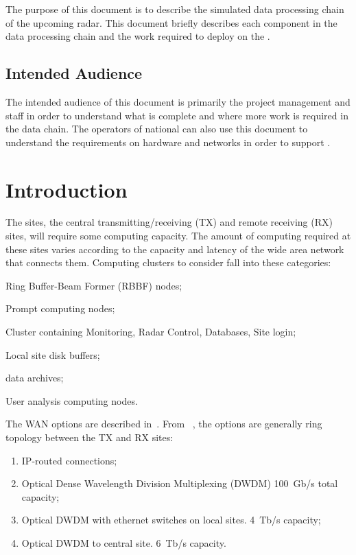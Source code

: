 \documentclass[12pt,a4paper]{article}
\begin{document}
The purpose of this document is to describe the simulated data processing chain of the upcoming \ED radar.
This document briefly describes each component in the data processing chain and the work required to deploy on the .

\subsection{Intended Audience}

The intended audience of this document is primarily the \ED project management and staff in order to understand what is complete and where more work is required in the data chain.
The operators of national  can also use this document to understand the requirements on hardware and networks in order to support \ED.

\section{Introduction}
\label{intro}

The \ED sites, the central transmitting/receiving (TX) and remote receiving (RX) sites, will require some computing capacity.
The amount of computing required at these sites varies according to the capacity and latency of the wide area network that connects them.
Computing clusters to consider fall into these categories:
\bitm
\item Ring Buffer-Beam Former (RBBF) nodes;
\item Prompt computing nodes;
\item Cluster containing Monitoring, Radar Control, Databases, Site login;
\item Local site disk buffers;
\item \ED data archives;
\item User analysis computing nodes.
\eitm

The WAN options are described in~\cite{wan-options}.
From ~\cite{wan-options}, the options are generally ring topology between the TX and RX sites:
\begin{enumerate}
\item IP-routed connections;
\item Optical Dense Wavelength Division Multiplexing (DWDM) 100~Gb/s total capacity;
\item Optical DWDM with ethernet switches on local sites. 4~Tb/s capacity;
\item Optical DWDM to central site. 6~Tb/s capacity.
\end{enumerate}
\end{document}
